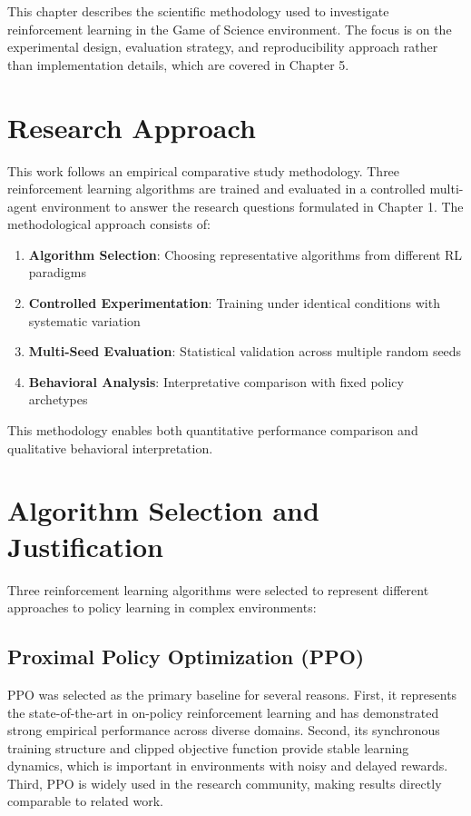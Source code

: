 \documentclass[english,bachelor]{hsluthesis}
\begin{document}
This chapter describes the scientific methodology used to investigate reinforcement learning in the Game of Science environment. The focus is on the experimental design, evaluation strategy, and reproducibility approach rather than implementation details, which are covered in Chapter 5.

\section{Research Approach}

This work follows an empirical comparative study methodology. Three reinforcement learning algorithms are trained and evaluated in a controlled multi-agent environment to answer the research questions formulated in Chapter 1. The methodological approach consists of:

\begin{enumerate}
    \item \textbf{Algorithm Selection}: Choosing representative algorithms from different RL paradigms
    \item \textbf{Controlled Experimentation}: Training under identical conditions with systematic variation
    \item \textbf{Multi-Seed Evaluation}: Statistical validation across multiple random seeds
    \item \textbf{Behavioral Analysis}: Interpretative comparison with fixed policy archetypes
\end{enumerate}

This methodology enables both quantitative performance comparison and qualitative behavioral interpretation.

\section{Algorithm Selection and Justification}

Three reinforcement learning algorithms were selected to represent different approaches to policy learning in complex environments:

\subsection{Proximal Policy Optimization (PPO)}

PPO was selected as the primary baseline for several reasons. First, it represents the state-of-the-art in on-policy reinforcement learning and has demonstrated strong empirical performance across diverse domains. Second, its synchronous training structure and clipped objective function provide stable learning dynamics, which is important in environments with noisy and delayed rewards. Third, PPO is widely used in the research community, making results directly comparable to related work.
\end{document}
